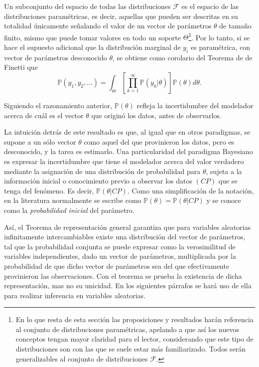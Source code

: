 Un subconjunto del espacio de todas las distribuciones $\mathcal{F}$ es el espacio de las distribuciones param\'etricas, es decir, aquellas que pueden ser descritas en su totalidad \'unicamente señalando el valor de un vector de par\'ametros $\theta$ de tamaño finito, mismo que puede tomar valores en todo un soporte $\Theta$\footnote{En lo que resta de esta secci\'on las proposiciones y resultados har\'an referencia al conjunto de distribuciones param\'etricas, apelando a que as\'i los nuevos conceptos tengan mayor claridad para el lector, considerando que este tipo de distribuciones son con las que se suele estar m\'as familiarizado. Todos ser\'an generalizables al conjunto de distribuciones $\mathcal{F}$.}. Por lo tanto, si se hace el supuesto adicional que la distribuci\'on marginal de $y_i$ es param\'etrica, con vector de par\'ametros desconocido $\theta$, se obtiene como corolario del Teorema de de Finetti que
\begin{equation*}
    \mathbb{P}(y_1,y_2,\ldots) =
    \int_{\Theta}\left[\prod_{k=1}^\infty \mathbb{P}(y_k|\theta)\right]\mathbb{P}(\theta)d\theta.
\end{equation*}

Siguiendo el razonamiento anterior, $\mathbb{P}(\theta)$ refleja la incertidumbre del modelador acerca de cu\'al es el vector $\theta$ que origin\'o los datos, antes de observarlos. 

La intuici\'on detr\'as de este resultado es que, al igual que en otros paradigmas, se supone a un s\'olo vector $\theta$ como aquel del que provinieron los datos, pero es desconocido, y la tarea es estimarlo. Una particularidad del paradigma Bayesiano es expresar la incertidumbre que tiene el modelador acerca del valor verdadero mediante la asignaci\'on de una distribuci\'on de probabilidad para $\theta$, sujeta a la informaci\'on inicial o conocimiento previo a observar los datos $(CP)$ que se tenga del fen\'omeno. Es decir, $\mathbb{P}(\theta|CP)$. Como una simplificaci\'on de la notaci\'on, en la literatura normalmente se escribe como $\mathbb{P}(\theta) = \mathbb{P}(\theta|CP)$ y se conoce como la \textit{probabilidad inicial} del par\'ametro.

As\'i, el Teorema de representaci\'on general garantiza que para variables aleatorias infinitamente intercambiables existe una distribuci\'on del vector de par\'ametros, tal que la probabilidad conjunta se puede expresar como la verosimilitud de variables independientes, dado un vector de par\'ametros, multiplicada por la probabilidad de que dicho vector de par\'ametros sea del que efectivamente provinieron las observaciones. Con el teorema se prueba la existencia de dicha representaci\'on, mas no su unicidad. En los siguientes p\'arrafos se har\'a uso de ella para realizar inferencia en variables aleatorias.

